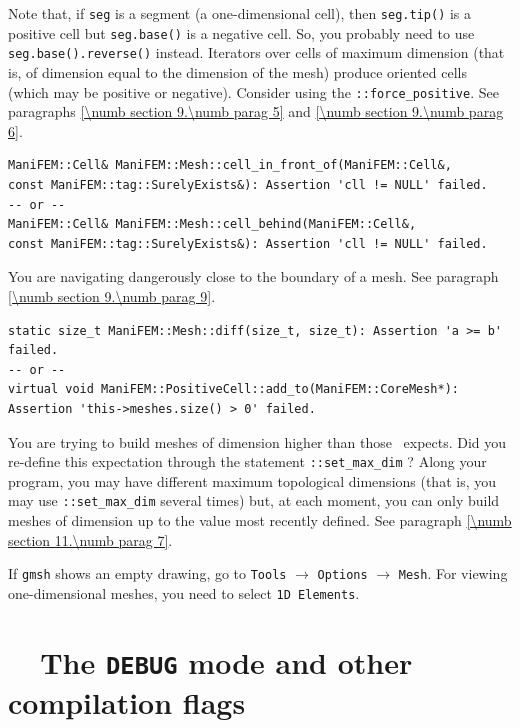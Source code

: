Note that, if {\small\tt seg} is a segment (a one-dimensional cell), then
{\small\tt seg.tip()} is a positive cell but {\small\tt seg.base()} is a negative cell.
So, you probably need to use {\small\tt seg.base().reverse()} instead.
Iterators over cells of maximum dimension (that is, of dimension equal to the dimension
of the mesh) produce oriented cells (which may be positive or negative).
Consider using the {\small\tt {}::force\_positive}.
See paragraphs \ref{\numb section 9.\numb parag 5} and \ref{\numb section 9.\numb parag 6}.

\begin{Verbatim}[commandchars=\\\{\},formatcom=\small\tt,baselinestretch=0.94]
ManiFEM::Cell& ManiFEM::Mesh::cell_in_front_of(ManiFEM::Cell&,
const ManiFEM::tag::SurelyExists&): Assertion 'cll != NULL' failed.
-- or --
ManiFEM::Cell& ManiFEM::Mesh::cell_behind(ManiFEM::Cell&,
const ManiFEM::tag::SurelyExists&): Assertion 'cll != NULL' failed.
\end{Verbatim}

You are navigating dangerously close to the boundary of a mesh.
See paragraph \ref{\numb section 9.\numb parag 9}.

\begin{Verbatim}[commandchars=\\\{\},formatcom=\small\tt,baselinestretch=0.94]
static size_t ManiFEM::Mesh::diff(size_t, size_t): Assertion 'a >= b' failed.
-- or --
virtual void ManiFEM::PositiveCell::add_to(ManiFEM::CoreMesh*):
Assertion 'this->meshes.size() > 0' failed.
\end{Verbatim}

You are trying to build meshes of dimension higher than those \maniFEM\ expects.
Did you re-define this expectation through the statement
{\small\tt {}::set\_max\_dim} ?
Along your program, you may have different maximum topological dimensions (that is,
you may use {\small\tt {}::set\_max\_dim} several times) but, at each moment,
you can only build meshes of dimension up to the value most recently defined.
See paragraph \ref{\numb section 11.\numb parag 7}.
\medskip

If {\tt gmsh} shows an empty drawing, go to {\small\tt Tools} $\to$ {\small\tt Options} $\to$
{\small\tt Mesh}.
For viewing one-dimensional meshes, you need to select {\small\tt 1D Elements}.


\section{~~The {\small\tt DEBUG} mode and other compilation flags}
\label{\numb section 11.\numb parag 15}

